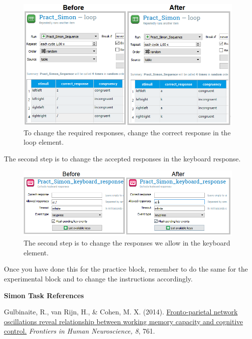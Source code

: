 \documentclass[
]{book}
\begin{document}
\begin{figure}

{\centering \includegraphics[width=0.99\linewidth]{images/changesimon/09response1} 

}

\caption{To change the required responses, change the correct response in the loop element.}\label{fig:Figure3-15}
\end{figure}

The second step is to change the accepted responses in the keyboard response.

\begin{figure}

{\centering \includegraphics[width=0.99\linewidth]{images/changesimon/10response2} 

}

\caption{The second step is to change the responses we allow in the keyboard element.}\label{fig:Figure3-16}
\end{figure}

Once you have done this for the practice block, remember to do the same for the experimental block and to change the instructions accordingly.

\textbf{Simon Task References}

Gulbinaite, R., van Rijn, H., \& Cohen, M. X. (2014). \href{https://www.frontiersin.org/articles/10.3389/fnhum.2014.00761/full}{Fronto-parietal network oscillations reveal relationship between working memory capacity and cognitive control.} \emph{Frontiers in Human Neuroscience, 8}, 761.
\end{document}
